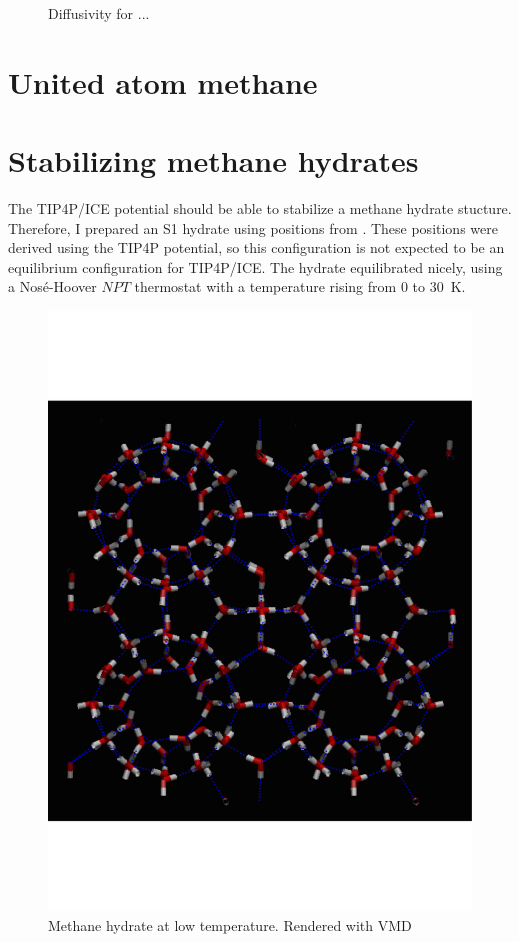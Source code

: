 \begin{figure}

\caption{Diffusivity for ...}
\label{fig:}
\end{figure}


\section{United atom methane}
\section{Stabilizing methane hydrates}
The TIP4P/ICE potential should be able to stabilize a methane hydrate stucture. Therefore, I prepared an S1 hydrate using positions from \cite{Takeuchi2013}. These positions were derived using the TIP4P potential, so this configuration is not expected to be an equilibrium configuration for TIP4P/ICE. The hydrate equilibrated nicely, using a Nosé-Hoover $NPT$ thermostat with a temperature rising from $0$ to \SI{30}{\kelvin}. 

\begin{figure}
\includegraphics[width=\textwidth]{../snapshots/first_stable_hydrate.pdf}
\caption{Methane hydrate at low temperature. Rendered with VMD}
\label{fig:part2:first_hydrate}
\end{figure}

